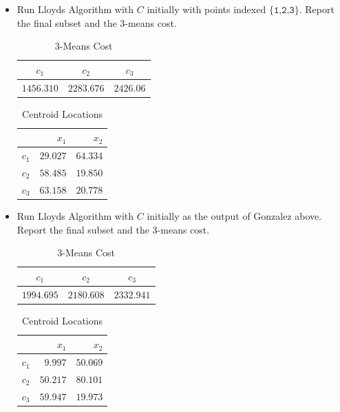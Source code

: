 \documentclass[11pt]{article}
\begin{document}
\begin{itemize}
\item  Run Lloyds Algorithm with $C$ initially with points indexed $\{\texttt{1,2,3}\}$.  Report the final subset and the $3$-means cost.  

\begin{table}[H]
\centering
\caption{$3$-Means Cost}
\begin{tabular}{c c c}
\hline\hline
$c_{1}$ & $c_{2}$ & $c_{3}$\\
\hline
$1456.310$ & $2283.676$ & $2426.06$\\
\hline
\end{tabular}
\end{table}

\begin{table}[H]
\centering
\caption{Centroid Locations}
\begin{tabular}{c | r r}
\hline\hline
  & $x_{1}$ & $x_{2}$ \\
\hline
$c_{1}$ & $29.027$ & $64.334$\\
$c_{2}$ & $58.485$ & $19.850$\\
$c_{3}$ & $63.158$ & $20.778$\\
\hline
\end{tabular}
\end{table}

\item  Run Lloyds Algorithm with $C$ initially as the output of \textsf{Gonzalez} above.  Report the final subset and the $3$-means cost.  

\begin{table}[H]
\centering
\caption{$3$-Means Cost}
\begin{tabular}{c c c}
\hline\hline
$c_{1}$ & $c_{2}$ & $c_{3}$\\
\hline
$1994.695$ & $2180.608$ & $2332.941$\\
\hline
\end{tabular}
\end{table}

\begin{table}[H]
\centering
\caption{Centroid Locations}
\begin{tabular}{c | r r}
\hline\hline
  & $x_{1}$ & $x_{2}$\\
\hline
$c_{1}$ & $9.997$ & $50.069$\\
$c_{2}$ & $50.217$ & $80.101$\\
$c_{3}$ & $59.947$ & $19.973$\\
\hline
\end{tabular}
\end{table}




\end{itemize}
\end{document}
